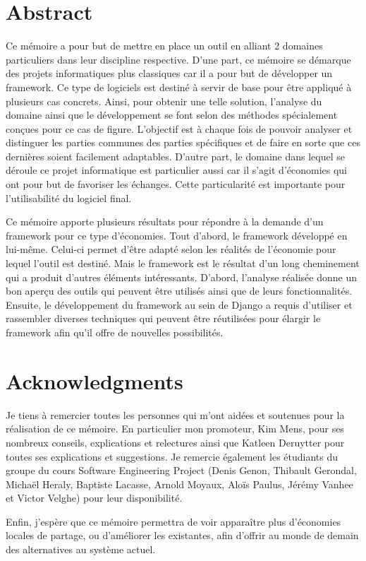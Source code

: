 \newpage
\thispagestyle{empty}
\mbox{}

\section*{Abstract}

Ce mémoire a pour but de mettre en place un outil en alliant 2 domaines particuliers dans leur discipline respective.  D'une part,  ce mémoire se démarque des projets informatiques plus classiques car il a pour but de développer un framework.  Ce type de logiciels est destiné à servir de base pour être appliqué à plusieurs cas concrets.   Ainsi,  pour obtenir une telle solution,  l'analyse du domaine ainsi que le développement se font selon des méthodes spécialement conçues pour ce cas de figure.  L'objectif est à chaque fois de pouvoir analyser et distinguer les parties communes des parties spécifiques et de faire en sorte que ces dernières soient facilement adaptables.  D'autre part,  le domaine dans lequel se déroule ce projet informatique est particulier aussi car il s'agit d'économies qui ont pour but de favoriser les échanges.  Cette particularité est importante pour l'utilisabilité du logiciel final.

Ce mémoire apporte plusieurs résultats pour répondre à la demande d'un framework pour ce type d'économies.  Tout d'abord,  le framework développé en lui-même.  Celui-ci permet d'être adapté selon les réalités de l'économie pour lequel l'outil est destiné.  Mais le framework est le résultat d'un long cheminement qui a produit d'autres éléments intéressants.  D'abord,  l'analyse réalisée donne un bon aperçu des outils qui peuvent être utilisés ainsi que de leurs fonctionnalités.  Ensuite,  le développement du framework au sein de Django a requis d'utiliser et rassembler diverses techniques qui peuvent être réutilisées pour élargir le framework afin qu'il offre de nouvelles possibilités.

\newpage
\thispagestyle{empty}
\mbox{}

\section*{Acknowledgments}

Je tiens à remercier toutes les personnes qui m'ont aidées et soutenues pour la réalisation de ce mémoire.  En particulier mon promoteur,  Kim Mens,  pour ses nombreux conseils,  explications et relectures ainsi que Katleen Deruytter pour toutes ses explications et  suggestions.  Je remercie également les étudiants du groupe du cours Software Engineering Project (Denis Genon, Thibault Gerondal, Michaël Heraly, Baptiste Lacasse, Arnold Moyaux, Aloïs Paulus, Jérémy Vanhee et Victor Velghe) pour leur disponibilité.  

Enfin,  j'espère que ce mémoire permettra de voir apparaître plus d'économies locales de partage,  ou d'améliorer les existantes,  afin d'offrir au monde de demain des alternatives au système actuel.
\newpage
\thispagestyle{empty}
\mbox{}